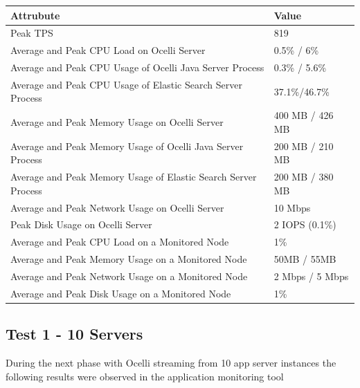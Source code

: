 \documentclass{llncs}
\begin{document}
\begin{flushleft}
    \begin{tabular}{ | l | l |}
    \hline
  Attrubute & Value  \\ \hline
  Peak TPS & 819  \\ \hline
  Average and Peak CPU Load on Ocelli Server & 0.5\% / 6\%  \\ \hline
  Average and Peak CPU Usage of Ocelli Java Server Process & 0.3\% / 5.6\% \\ \hline
 Average and Peak CPU Usage of Elastic Search Server Process & 37.1\%/46.7\%	  \\ \hline
  Average and Peak Memory Usage on Ocelli Server & 400 MB / 426 MB	 \\ \hline
  Average and Peak Memory Usage of Ocelli Java Server Process &	200 MB / 210 MB		 \\ \hline
 Average and Peak Memory Usage of Elastic Search Server Process &	200 MB / 380 MB		 \\ \hline
Average and Peak Network Usage on Ocelli Server &	10 Mbps 	 \\ \hline
Peak Disk Usage on Ocelli Server &	2 IOPS (0.1\%) 		 \\ \hline
Average and Peak CPU Load on a Monitored Node& 	1\% 	 \\ \hline
  Average and Peak Memory Usage on a Monitored Node &	50MB / 55MB	 \\ \hline
Average and Peak Network Usage on a Monitored Node &	2 Mbps / 5 Mbps		 \\ \hline
  Average and Peak Disk Usage on a Monitored Node &  1\%	\\ 
    \hline
    \end{tabular}
\end{flushleft}

\subsection{Test 1 - 10 Servers}

During the next phase with Ocelli streaming from 10 app server instances the following results were observed in the application monitoring tool
\end{document}
